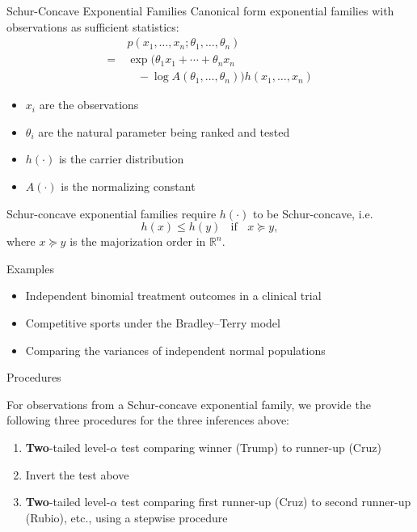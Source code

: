 \documentclass[final]{beamer}
\newlength{\onecolwid}
\newcommand{\RR}{\mathbb{R}}
\begin{document}
\begin{frame}[t]
\begin{columns}[t]
\begin{column}{\onecolwid}
\begin{block}{Schur-Concave Exponential Families}
Canonical form exponential families with observations as sufficient statistics:
\begin{align*}
&~ p(x_1, \ldots, x_n; \theta_1, \ldots, \theta_n) \\
= &~ \exp(\theta_1 x_1 + \cdots + \theta_n x_n \\
&~ ~~~~ - \log A(\theta_1, \ldots, \theta_n)) h(x_1, \ldots, x_n)
\end{align*}
\begin{itemize}
\item $x_i$ are the observations
\item $\theta_i$ are the natural parameter being ranked and tested
\item $h(\cdot)$ is the carrier distribution
\item $A(\cdot)$ is the normalizing constant
\end{itemize}

Schur-concave exponential families require $h(\cdot)$ to be Schur-concave, i.e.
\[
h(x) \le h(y) ~~~~ \text{if} ~~~~ x \succeq y,
\]
where $x \succeq y$ is the majorization order in $\RR^n$.

\end{block}

\begin{block}{Examples}

\begin{itemize}
	\item Independent binomial treatment outcomes in a clinical trial
	\item Competitive sports under the Bradley--Terry model
	\item Comparing the variances of independent normal populations
\end{itemize}

\end{block}

\begin{alertblock}{Procedures}

For observations from a Schur-concave exponential family, we provide the following three procedures for the three inferences above:
\begin{enumerate}
	\item {\bf Two}-tailed level-$\alpha$ test comparing winner (Trump) to runner-up (Cruz)
	\item Invert the test above
	\item {\bf Two}-tailed level-$\alpha$ test comparing first runner-up (Cruz) to second runner-up (Rubio), etc., using a stepwise procedure
\end{enumerate}


\end{alertblock}
\end{column}
\end{columns}
\end{frame}
\end{document}
